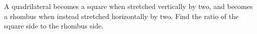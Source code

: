 A quadrilateral becomes a square when stretched vertically by two, and becomes a rhombus when instead stretched horizontally by two. Find the ratio of the square side to the rhombus side.
